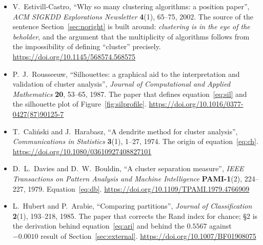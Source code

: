 \documentclass[11pt]{article}
\begin{document}
\begin{itemize}[leftmargin=*]
  \item V.\ Estivill-Castro, ``Why so many clustering algorithms: a position
    paper'', \emph{ACM SIGKDD Explorations Newsletter} \textbf{4}(1), 65--75,
    2002. The source of the sentence Section~\ref{sec:noright} is built
    around: \emph{clustering is in the eye of the beholder}, and the argument
    that the multiplicity of algorithms follows from the impossibility of
    defining ``cluster'' precisely.
    \url{https://doi.org/10.1145/568574.568575}
  \item P.\ J.\ Rousseeuw, ``Silhouettes: a graphical aid to the
    interpretation and validation of cluster analysis'', \emph{Journal of
    Computational and Applied Mathematics} \textbf{20}, 53--65, 1987. The
    paper that defines equation~\eqref{eq:sil} and the silhouette plot of
    Figure~\ref{fig:silprofile}.
    \url{https://doi.org/10.1016/0377-0427(87)90125-7}
  \item T.\ Cali\'nski and J.\ Harabasz, ``A dendrite method for cluster
    analysis'', \emph{Communications in Statistics} \textbf{3}(1), 1--27,
    1974. The origin of equation~\eqref{eq:ch}.
    \url{https://doi.org/10.1080/03610927408827101}
  \item D.\ L.\ Davies and D.\ W.\ Bouldin, ``A cluster separation measure'',
    \emph{IEEE Transactions on Pattern Analysis and Machine Intelligence}
    \textbf{PAMI-1}(2), 224--227, 1979. Equation~\eqref{eq:db}.
    \url{https://doi.org/10.1109/TPAMI.1979.4766909}
  \item L.\ Hubert and P.\ Arabie, ``Comparing partitions'', \emph{Journal of
    Classification} \textbf{2}(1), 193--218, 1985. The paper that corrects the
    Rand index for chance; \S2 is the derivation behind
    equation~\eqref{eq:ari} and behind the $0.5567$ against $-0.0010$ result
    of Section~\ref{sec:external}.
    \url{https://doi.org/10.1007/BF01908075}
\end{itemize}

\notesources{\AMLUnitVIISources}
\end{document}
